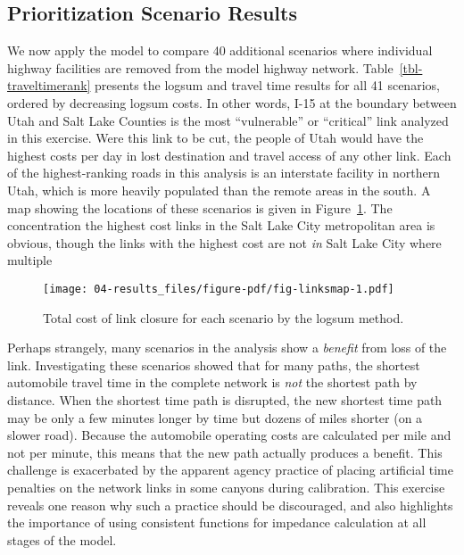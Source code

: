 \documentclass[
  letterpaper,
]{trb}
\begin{document}
\hypertarget{prioritization-scenario-results}{%
\subsection{Prioritization Scenario
Results}\label{prioritization-scenario-results}}

We now apply the model to compare 40 additional scenarios where
individual highway facilities are removed from the model highway
network. Table~\ref{tbl-traveltimerank} presents the logsum and travel
time results for all 41 scenarios, ordered by decreasing logsum costs.
In other words, I-15 at the boundary between Utah and Salt Lake Counties
is the most ``vulnerable'' or ``critical'' link analyzed in this
exercise. Were this link to be cut, the people of Utah would have the
highest costs per day in lost destination and travel access of any other
link. Each of the highest-ranking roads in this analysis is an
interstate facility in northern Utah, which is more heavily populated
than the remote areas in the south. A map showing the locations of these
scenarios is given in Figure~\ref{fig-linksmap}. The concentration the
highest cost links in the Salt Lake City metropolitan area is obvious,
though the links with the highest cost are not \emph{in} Salt Lake City
where multiple

\begin{figure}

{\centering \texttt{[image: 04-results\_files/figure-pdf/fig-linksmap-1.pdf]}

}

\caption{\label{fig-linksmap}Total cost of link closure for each
scenario by the logsum method.}

\end{figure}

Perhaps strangely, many scenarios in the analysis show a \emph{benefit}
from loss of the link. Investigating these scenarios showed that for
many paths, the shortest automobile travel time in the complete network
is \emph{not} the shortest path by distance. When the shortest time path
is disrupted, the new shortest time path may be only a few minutes
longer by time but dozens of miles shorter (on a slower road). Because
the automobile operating costs are calculated per mile and not per
minute, this means that the new path actually produces a benefit. This
challenge is exacerbated by the apparent agency practice of placing
artificial time penalties on the network links in some canyons during
calibration. This exercise reveals one reason why such a practice should
be discouraged, and also highlights the importance of using consistent
functions for impedance calculation at all stages of the model.
\end{document}
